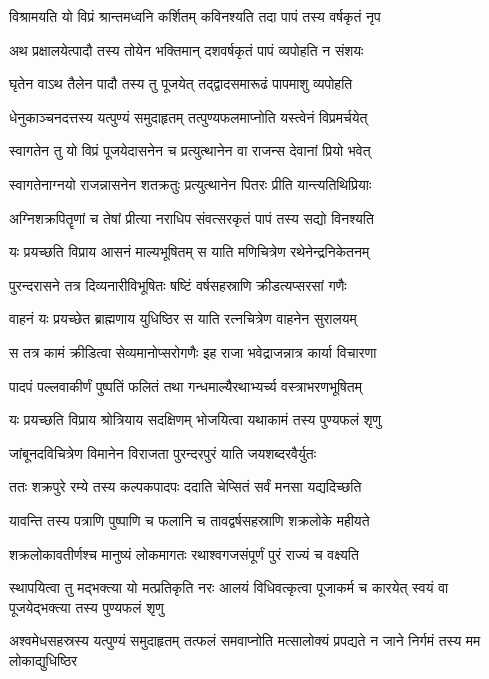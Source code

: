 \twolineshloka
{विश्रामयति यो विप्रं श्रान्तमध्वनि कर्शितम्}
{कविनश्यति तदा पापं तस्य वर्षकृतं नृप}


\twolineshloka
{अथ प्रक्षालयेत्पादौ तस्य तोयेन भक्तिमान्}
{दशवर्षकृतं पापं व्यपोहति न संशयः}


\twolineshloka
{घृतेन वाऽथ तैलेन पादौ तस्य तु पूजयेत्}
{तद्द्वादसमारूढं पापमाशु व्यपोहति}


\twolineshloka
{धेनुकाञ्चनदत्तस्य यत्पुण्यं समुदाहृतम्}
{तत्पुण्यफलमाप्नोति यस्त्वेनं विप्रमर्चयेत्}


\twolineshloka
{स्वागतेन तु यो विप्रं पूजयेदासनेन च}
{प्रत्युत्थानेन वा राजन्स देवानां प्रियो भवेत्}


\twolineshloka
{स्वागतेनाग्नयो राजन्नासनेन शतक्रतुः}
{प्रत्युत्थानेन पितरः प्रीति यान्त्यतिथिप्रियाः}


\twolineshloka
{अग्निशक्रपितॄणां च तेषां प्रीत्या नराधिप}
{संवत्सरकृतं पापं तस्य सद्यो विनश्यति}


\twolineshloka
{यः प्रयच्छति विप्राय आसनं माल्यभूषितम्}
{स याति मणिचित्रेण रथेनेन्द्रनिकेतनम्}


\twolineshloka
{पुरन्दरासने तत्र दिव्यनारीविभूषितः}
{षष्टिं वर्षसहस्राणि क्रीडत्यप्सरसां गणैः}


\twolineshloka
{वाहनं यः प्रयच्छेत ब्राह्मणाय युधिष्ठिर}
{स याति रत्नचित्रेण वाहनेन सुरालयम्}


\twolineshloka
{स तत्र कामं क्रीडित्वा सेव्यमानोप्सरोगणैः}
{इह राजा भवेद्राजन्नात्र कार्या विचारणा}


\twolineshloka
{पादपं पल्लवाकीर्णं पुष्पतिं फलितं तथा}
{गन्धमाल्यैरथाभ्यर्च्य वस्त्राभरणभूषितम्}


\twolineshloka
{यः प्रयच्छति विप्राय श्रोत्रियाय सदक्षिणम्}
{भोजयित्वा यथाकामं तस्य पुण्यफलं शृणु}


\twolineshloka
{जांबूनदविचित्रेण विमानेन विराजता}
{पुरन्दरपुरं याति जयशब्दरवैर्युतः}


\twolineshloka
{ततः शक्रपुरे रम्ये तस्य कल्पकपादपः}
{ददाति चेप्सितं सर्वं मनसा यद्यदिच्छति}


\twolineshloka
{यावन्ति तस्य पत्राणि पुष्पाणि च फलानि च}
{तावद्वर्षसहस्राणि शक्रलोके महीयते}


\twolineshloka
{शक्रलोकावतीर्णश्च मानुष्यं लोकमागतः}
{रथाश्वगजसंपूर्णं पुरं राज्यं च वक्ष्यति}


\threelineshloka
{स्थापयित्वा तु मद्भक्त्या यो मत्प्रतिकृति नरः}
{आलयं विधिवत्कृत्वा पूजाकर्म च कारयेत्}
{स्वयं वा पूजयेद्भक्त्या तस्य पुण्यफलं शृणु}


\threelineshloka
{अश्वमेधसहस्रस्य यत्पुण्यं समुदाहृतम्}
{तत्फलं समवाप्नोति मत्सालोक्यं प्रपद्यते}
{न जाने निर्गमं तस्य मम लोकाद्युधिष्ठिर}


